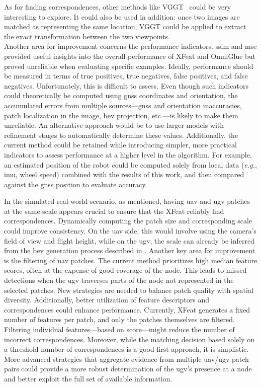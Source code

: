 As for finding correspondences, other methods like VGGT~\cite{wang_vggt_2025} could be very interesting to explore.
It could also be used in addition: once two images are matched as representing the same location, VGGT could be applied
to extract the exact transformation between the two viewpoints.\\
Another area for improvement concerns the performance indicators.
\gls{ssim} and \gls{mse} provided useful insights into the overall performance of XFeat and OmniGlue but proved unreliable
when evaluating specific examples.
Ideally, performance should be measured in terms of true positives, true negatives, false positives, and false negatives.
Unfortunately, this is difficult to assess.
Even though such indicators could theoretically be computed using \gls{gnss} coordinates and orientation, the accumulated errors
from multiple sources---\gls{gnss} and orientation inaccuracies, patch localization in the image, \gls{bev} projection, etc.---is
likely to make them unreliable.
An alternative approach would be to use larger models with refinement stages to automatically determine these values.
Additionally, the current method could be retained while introducing simpler, more practical indicators to assess performance at a higher level in the algorithm.
For example, an estimated position of the robot could be computed solely from local data (\textit{e.g.}, \gls{imu}, wheel speed) combined
with the results of this work, and then compared against the \gls{gnss} position to evaluate accuracy.

In the simulated real-world scenario, as mentioned, having \gls{uav} and \gls{ugv} patches at the same scale appears
crucial to ensure that the XFeat reliably find correspondences.
Dynamically computing the patch size and corresponding scale could improve consistency.
On the \gls{uav} side, this would involve using the camera’s field of view and flight height, while on the \gls{ugv},
the scale can already be inferred from the \gls{bev} generation process described in .
Another key area for improvement is the filtering of \gls{uav} patches.
The current method prioritizes high median feature scores, often at the expense of good coverage of the node.
This leads to missed detections when the \gls{ugv} traverses parts of the node not represented in the selected patches.
New strategies are needed to balance patch quality with spatial diversity.
Additionally, better utilization of feature descriptors and correspondences could enhance performance.
Currently, XFeat generates a fixed number of features per patch, and only the patches themselves are filtered.
Filtering individual features---based on score---might reduce the number of incorrect correspondences.
Moreover, while the matching decision based solely on a threshold number of correspondences is a good first approach, it is simplistic.
More advanced strategies that aggregate evidence from multiple \gls{uav}/\gls{ugv} patch pairs could provide a more
robust determination of the \gls{ugv}’s presence at a node and better exploit the full set of available information.

